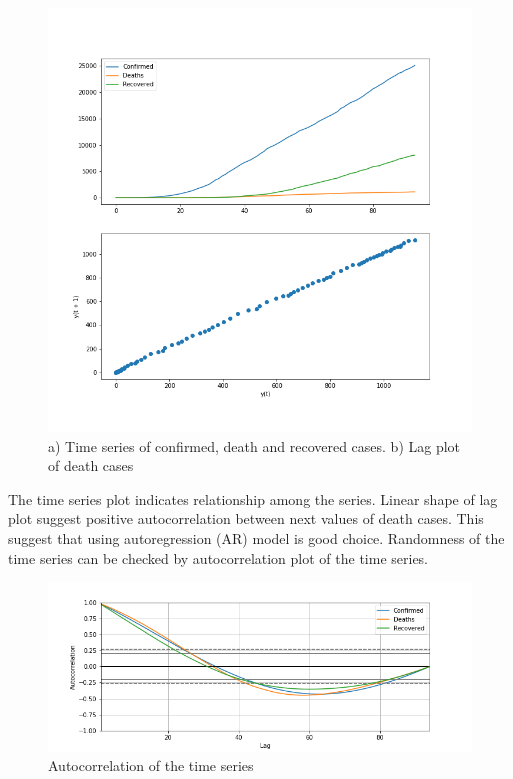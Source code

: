 \documentclass[conference]{IEEEtran}
\begin{document}
 \begin{figure}[h!]
    \includegraphics[width=\linewidth]{images/Correlation_lag_Deaths.png}
    \caption{a) Time series of confirmed, death and recovered cases. b) Lag plot of death cases}
    \label{fig:lag_plot}
\end{figure}

The time series plot indicates relationship among the series. Linear shape of lag plot suggest positive autocorrelation between next values of death cases.
 This suggest that using autoregression (AR) model is good choice.
Randomness of the time series can be checked by autocorrelation plot of the time series. 

\begin{figure}[h!]
    \includegraphics[width=\linewidth]{images/AutoCorrelation.png}
    \caption{Autocorrelation of the time series}
    \label{fig:AutoCorrelation}
\end{figure}
\end{document}
